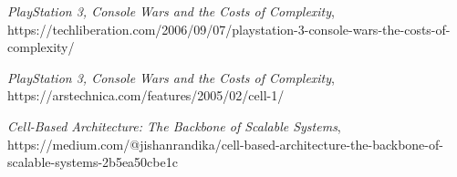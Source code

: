 \documentclass[10pt,compsoc]{IEEEtran}
\begin{document}
\begin{thebibliography}{1}
			{\it{PlayStation 3, Console Wars and the Costs of Complexity}}, 			
			https://techliberation.com/2006/09/07/playstation-3-console-wars-the-costs-of-complexity/\newline
			
			
			{\it{PlayStation 3, Console Wars and the Costs of Complexity}}, 			
			https://arstechnica.com/features/2005/02/cell-1/\newline
			
			{\it{Cell-Based Architecture: The Backbone of Scalable Systems}}, 			
			https://medium.com/@jishanrandika/cell-based-architecture-the-backbone-of-scalable-systems-2b5ea50cbe1c
			
		
		\end{thebibliography}
		
			
	
		
\end{document}
